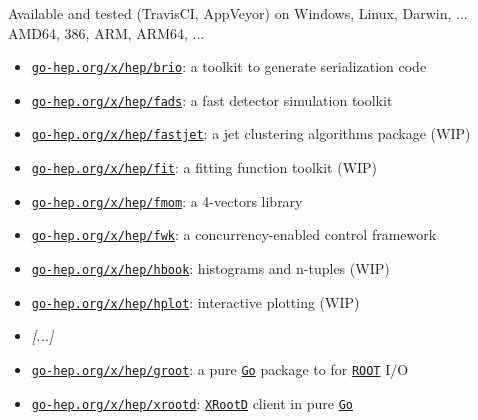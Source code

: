 \documentclass[9pt]{beamer}
\newcommand{\myblue} [1] {{\color{blue}#1}}
\begin{document}
\begin{frame}[fragile]
\frametitle{}


Available and tested (TravisCI, AppVeyor) on Windows, Linux, Darwin, ... AMD64, 386, ARM, ARM64, ...


\begin{itemize}
\item \myblue{\href{https://go-hep.org/x/hep/brio}{\texttt{go-hep.org/x/hep/brio}}}: a toolkit to generate serialization code
\item \myblue{\href{https://go-hep.org/x/hep/fads}{\texttt{go-hep.org/x/hep/fads}}}: a fast detector simulation toolkit
\item \myblue{\href{https://go-hep.org/x/hep/fastjet}{\texttt{go-hep.org/x/hep/fastjet}}}: a jet clustering algorithms package (WIP)
\item \myblue{\href{https://go-hep.org/x/hep/fit}{\texttt{go-hep.org/x/hep/fit}}}: a fitting function toolkit (WIP)
\item \myblue{\href{https://go-hep.org/x/hep/fmom}{\texttt{go-hep.org/x/hep/fmom}}}: a 4-vectors library
\item \myblue{\href{https://go-hep.org/x/hep/fwk}{\texttt{go-hep.org/x/hep/fwk}}}: a concurrency-enabled control framework
\item \myblue{\href{https://go-hep.org/x/hep/hbook}{\texttt{go-hep.org/x/hep/hbook}}}: histograms and n-tuples (WIP)
\item \myblue{\href{https://go-hep.org/x/hep/hplot}{\texttt{go-hep.org/x/hep/hplot}}}: interactive plotting (WIP)
\item \emph{[...]}
\item \myblue{\href{https://go-hep.org/x/hep/groot}{\texttt{go-hep.org/x/hep/groot}}}: a pure \myblue{\href{https://golang.org}{\texttt{Go}}} package to for \myblue{\href{https://root.cern.ch}{\texttt{ROOT}}} I/O
\item \myblue{\href{https://go-hep.org/x/hep/xrootd}{\texttt{go-hep.org/x/hep/xrootd}}}: \myblue{\href{http://xrootd.org}{\texttt{XRootD}}} client in pure \myblue{\href{https://golang.org}{\texttt{Go}}}
\end{itemize}


\end{frame}
\end{document}
